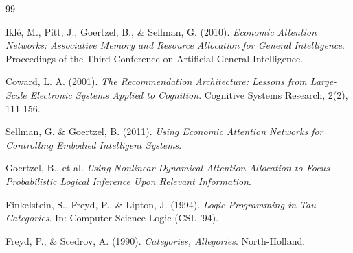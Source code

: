 \documentclass[11pt]{article}
\theoremstyle{definition}
\begin{document}
\begin{thebibliography}{99}

Iklé, M., Pitt, J., Goertzel, B., \& Sellman, G. (2010).
\textit{Economic Attention Networks: Associative Memory and Resource Allocation for General Intelligence}.
Proceedings of the Third Conference on Artificial General Intelligence.

Coward, L. A. (2001).
\textit{The Recommendation Architecture: Lessons from Large-Scale Electronic Systems Applied to Cognition}.
Cognitive Systems Research, 2(2), 111-156.

Sellman, G. \& Goertzel, B. (2011).
\textit{Using Economic Attention Networks for Controlling Embodied Intelligent Systems}.

Goertzel, B., et al.
\textit{Using Nonlinear Dynamical Attention Allocation to Focus Probabilistic Logical Inference Upon Relevant Information}.

Finkelstein, S., Freyd, P., \& Lipton, J. (1994).
\textit{Logic Programming in Tau Categories}.
In: Computer Science Logic (CSL '94).

Freyd, P., \& Scedrov, A. (1990).
\textit{Categories, Allegories}.
North-Holland.

\end{thebibliography}
\end{document}
